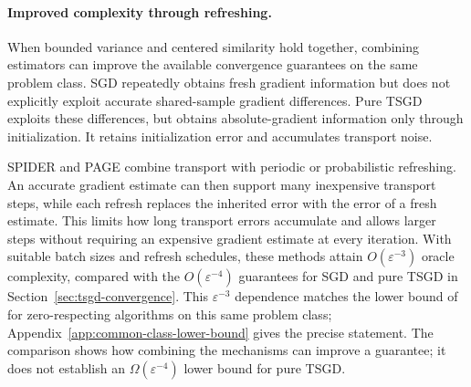 \paragraph{Improved complexity through refreshing.}
When bounded variance and centered similarity hold together, combining
estimators can improve the available convergence guarantees on the same
problem class. SGD repeatedly obtains fresh gradient information but
does not explicitly exploit accurate shared-sample gradient differences.
Pure TSGD exploits these differences, but obtains absolute-gradient
information only through initialization. It retains initialization
error and accumulates transport noise.

SPIDER \citep{fang2018spider} and PAGE \citep{li2021page} combine
transport with periodic or probabilistic refreshing. An accurate
gradient estimate can then support many inexpensive transport steps,
while each refresh replaces the inherited error with the error of a
fresh estimate. This limits how long transport errors accumulate and
allows larger steps without requiring an expensive gradient estimate
at every iteration.
With suitable batch sizes and refresh schedules,
these methods attain $O(\varepsilon^{-3})$ oracle complexity, compared
with the $O(\varepsilon^{-4})$ guarantees for SGD and pure TSGD in
Section~\ref{sec:tsgd-convergence}. This $\varepsilon^{-3}$ dependence
matches the lower bound of
\citet{pmlr-v300-fradin26a} for zero-respecting algorithms on this
same problem class; Appendix~\ref{app:common-class-lower-bound} gives the
precise statement. The comparison shows
how combining the mechanisms can improve a guarantee; it does not
establish an $\Omega(\varepsilon^{-4})$ lower bound for pure TSGD.

